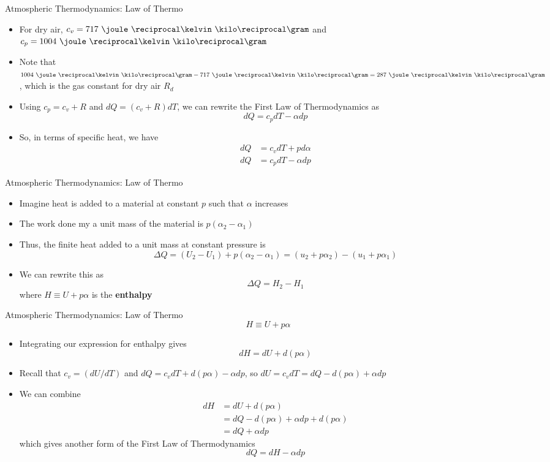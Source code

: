 \begin{frame}{Atmospheric Thermodynamics:  Law of Thermo}
\begin{itemize}
	\item For dry air, $c_v=717\ \joule\ \reciprocal\kelvin\ \kilo\reciprocal\gram$ and $c_p=1004\ \joule\ \reciprocal\kelvin\ \kilo\reciprocal\gram$
	\item Note that $1004\ \joule\ \reciprocal\kelvin\ \kilo\reciprocal\gram-717\ \joule\ \reciprocal\kelvin\ \kilo\reciprocal\gram = 287\ \joule\ \reciprocal\kelvin\ \kilo\reciprocal\gram$, which is the gas constant for dry air $R_d$
	\item Using $c_p = c_v + R$ and $dQ = (c_v + R)dT$, we can rewrite the First Law of Thermodynamics as
	$$dQ = c_pdT - \alpha dp$$
	\item So, in terms of specific heat, we have
	\begin{align*}
		dQ &= c_vdT + pd\alpha\\
		dQ &= c_pdT - \alpha dp
	\end{align*}
\end{itemize}
\end{frame}
\begin{frame}{Atmospheric Thermodynamics:  Law of Thermo}
\begin{itemize}
	\item Imagine heat is added to a material at constant $p$ such that $\alpha$ increases
	\item The work done my a unit mass of the material is $p(\alpha_2 -\alpha_1)$
	\item Thus, the finite heat added to a unit mass at constant pressure is
	$$\Delta Q = (U_2-U_1) + p(\alpha_2 -\alpha_1) = (u_2+p\alpha_2) -(u_1+p\alpha_1)$$
	\item We can rewrite this as
	$$\Delta Q = H_2 - H_1$$
	where $H \equiv U+p\alpha$ is the \textbf{enthalpy}
\end{itemize}
\end{frame}
\begin{frame}{Atmospheric Thermodynamics:  Law of Thermo}
$$H \equiv U+p\alpha$$
\begin{itemize}
	\item Integrating our expression for enthalpy gives
	$$dH=dU + d(p\alpha)$$
	\item Recall that $c_v = (dU/dT)$ and $dQ = c_vdT + d(p\alpha) - \alpha dp$, so $dU=c_vdT=dQ-d(p\alpha)+\alpha dp$
	\item We can combine
	\begin{align*}
		dH &= dU + d(p\alpha)\\
		&= dQ-d(p\alpha)+\alpha dp +d(p\alpha)\\
		&= dQ+\alpha dp
	\end{align*}
	which gives another form of the First Law of Thermodynamics
	$$dQ = dH - \alpha dp$$
\end{itemize}
\end{frame}
